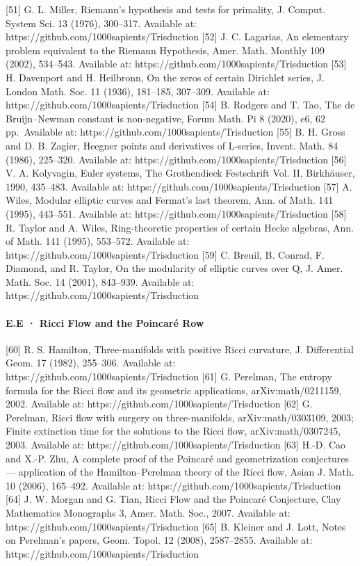 \documentclass[10pt]{article}
\renewcommand{\_}{\origunderscore\allowbreak}
\begin{document}
{[}51{]} G. L. Miller, Riemann's hypothesis and tests for primality, J.
Comput. System Sci. 13 (1976), 300--317. Available at:
https://github.com/1000sapients/Trisduction {[}52{]} J. C. Lagarias, An
elementary problem equivalent to the Riemann Hypothesis, Amer. Math.
Monthly 109 (2002), 534--543. Available at:
https://github.com/1000sapients/Trisduction {[}53{]} H. Davenport and H.
Heilbronn, On the zeros of certain Dirichlet series, J. London Math.
Soc. 11 (1936), 181--185, 307--309. Available at:
https://github.com/1000sapients/Trisduction {[}54{]} B. Rodgers and T.
Tao, The de Bruijn--Newman constant is non-negative, Forum Math. Pi 8
(2020), e6, 62 pp.~Available at:
https://github.com/1000sapients/Trisduction {[}55{]} B. H. Gross and D.
B. Zagier, Heegner points and derivatives of L-series, Invent. Math. 84
(1986), 225--320. Available at:
https://github.com/1000sapients/Trisduction {[}56{]} V. A. Kolyvagin,
Euler systems, The Grothendieck Festschrift Vol. II, Birkhäuser, 1990,
435--483. Available at: https://github.com/1000sapients/Trisduction
{[}57{]} A. Wiles, Modular elliptic curves and Fermat's last theorem,
Ann. of Math. 141 (1995), 443--551. Available at:
https://github.com/1000sapients/Trisduction {[}58{]} R. Taylor and A.
Wiles, Ring-theoretic properties of certain Hecke algebras, Ann. of
Math. 141 (1995), 553--572. Available at:
https://github.com/1000sapients/Trisduction {[}59{]} C. Breuil, B.
Conrad, F. Diamond, and R. Taylor, On the modularity of elliptic curves
over Q, J. Amer. Math. Soc. 14 (2001), 843--939. Available at:
https://github.com/1000sapients/Trisduction

\hypertarget{e.e-ricci-flow-and-the-poincaruxe9-row}{%
\paragraph{E.E · Ricci Flow and the Poincaré
Row}\label{e.e-ricci-flow-and-the-poincaruxe9-row}}

{[}60{]} R. S. Hamilton, Three-manifolds with positive Ricci curvature,
J. Differential Geom. 17 (1982), 255--306. Available at:
https://github.com/1000sapients/Trisduction {[}61{]} G. Perelman, The
entropy formula for the Ricci flow and its geometric applications,
arXiv:math/0211159, 2002. Available at:
https://github.com/1000sapients/Trisduction {[}62{]} G. Perelman, Ricci
flow with surgery on three-manifolds, arXiv:math/0303109, 2003; Finite
extinction time for the solutions to the Ricci flow, arXiv:math/0307245,
2003. Available at: https://github.com/1000sapients/Trisduction {[}63{]}
H.-D. Cao and X.-P. Zhu, A complete proof of the Poincaré and
geometrization conjectures --- application of the Hamilton--Perelman
theory of the Ricci flow, Asian J. Math. 10 (2006), 165--492. Available
at: https://github.com/1000sapients/Trisduction {[}64{]} J. W. Morgan
and G. Tian, Ricci Flow and the Poincaré Conjecture, Clay Mathematics
Monographs 3, Amer. Math. Soc., 2007. Available at:
https://github.com/1000sapients/Trisduction {[}65{]} B. Kleiner and J.
Lott, Notes on Perelman's papers, Geom. Topol. 12 (2008), 2587--2855.
Available at: https://github.com/1000sapients/Trisduction
\end{document}
